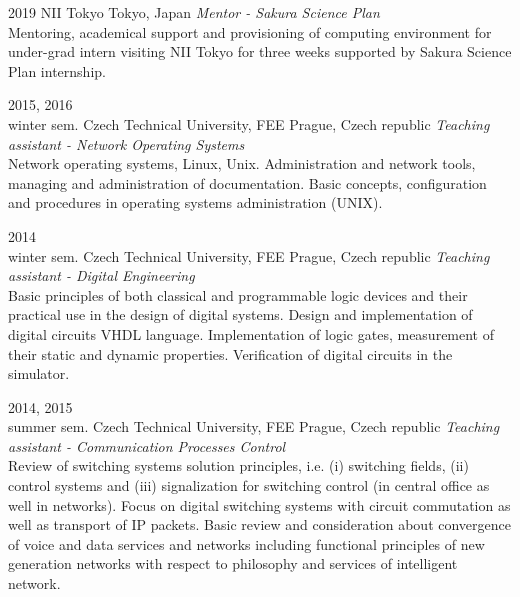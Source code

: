 \documentclass[]{friggeri-cv} %
\begin{document}
\begin{entrylist}

\entry
{2019}
{NII Tokyo}
{Tokyo, Japan}
{\emph{Mentor - Sakura Science Plan}\\
Mentoring, academical support and provisioning of computing environment for under-grad intern visiting NII Tokyo for three weeks supported by Sakura Science Plan internship.
}

\entry
{2015, 2016\\
winter sem.}
{Czech Technical University, FEE}
{Prague, Czech republic}
{\emph{Teaching assistant - Network Operating Systems}\\
Network operating systems, Linux, Unix. Administration and network tools, managing and administration of documentation. Basic concepts, configuration and procedures in operating systems administration (UNIX). \\
\href{https://www.fel.cvut.cz/en/education/bk_peo/predmety/12/57/p12573204.html}{}}

\entry
{2014\\
winter sem.}
{Czech Technical University, FEE}
{Prague, Czech republic}
{\emph{Teaching assistant - Digital Engineering}\\
Basic principles of both classical and programmable logic devices and their practical use in the design of digital systems. Design and implementation of digital circuits VHDL language. Implementation of logic gates, measurement of their static and dynamic properties. Verification of digital circuits in the simulator.\\
\href{https://www.fel.cvut.cz/en/education/bk/predmety/13/53/p1353506.html}{}}

\entry
{2014, 2015\\
summer sem.}
{Czech Technical University, FEE}
{Prague, Czech republic}
{\emph{Teaching assistant - Communication Processes Control}\\
Review of switching systems solution principles, i.e. (i) switching fields, (ii) control systems and (iii) signalization for switching control (in central office as well in networks). Focus on digital switching systems with circuit commutation as well as transport of IP packets. Basic review and consideration about convergence of voice and data services and networks including functional principles of new generation networks with respect to philosophy and services of intelligent network. \\
\href{https://www.fel.cvut.cz/en/education/bk_peo/predmety/12/57/p12573204.html}{}}

\end{entrylist}
\fi
\end{document}
